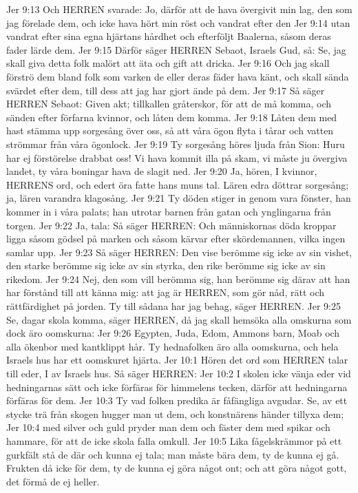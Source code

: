 Jer 9:13  Och HERREN svarade: Jo, därför att de hava övergivit min lag, den som jag förelade dem, och icke hava hört min röst och vandrat efter den
Jer 9:14  utan vandrat efter sina egna hjärtans hårdhet och efterföljt Baalerna, såsom deras fader lärde dem.
Jer 9:15  Därför säger HERREN Sebaot, Israels Gud, så: Se, jag skall giva detta folk malört att äta och gift att dricka.
Jer 9:16  Och jag skall förströ dem bland folk som varken de eller deras fäder hava känt, och skall sända svärdet efter dem, till dess att jag har gjort ände på dem.
Jer 9:17  Så säger HERREN Sebaot: Given akt; tillkallen gråterskor, för att de må komma, och sänden efter förfarna kvinnor, och låten dem komma.
Jer 9:18  Låten dem med hast stämma upp sorgesång över oss, så att våra ögon flyta i tårar och vatten strömmar från våra ögonlock.
Jer 9:19  Ty sorgesång höres ljuda från Sion: Huru har ej förstörelse drabbat oss! Vi hava kommit illa på skam, vi måste ju övergiva landet, ty våra boningar hava de slagit ned.
Jer 9:20  Ja, hören, I kvinnor, HERRENS ord, och edert öra fatte hans muns tal. Lären edra döttrar sorgesång; ja, lären varandra klagosång.
Jer 9:21  Ty döden stiger in genom vara fönster, han kommer in i våra palats; han utrotar barnen från gatan och ynglingarna från torgen.
Jer 9:22  Ja, tala: Så säger HERREN: Och människornas döda kroppar ligga såsom gödsel på marken och såsom kärvar efter skördemannen, vilka ingen samlar upp.
Jer 9:23  Så säger HERREN: Den vise berömme sig icke av sin vishet, den starke berömme sig icke av sin styrka, den rike berömme sig icke av sin rikedom.
Jer 9:24  Nej, den som vill berömma sig, han berömme sig därav att han har förstånd till att känna mig: att jag är HERREN, som gör nåd, rätt och rättfärdighet på jorden. Ty till sådana har jag behag, säger HERREN.
Jer 9:25  Se, dagar skola komma, säger HERREN, då jag skall hemsöka alla omskurna som dock äro oomskurna:
Jer 9:26  Egypten, Juda, Edom, Ammons barn, Moab och alla ökenbor med kantklippt hår. Ty hednafolken äro alla oomskurna, och hela Israels hus har ett oomskuret hjärta.
Jer 10:1  Hören det ord som HERREN talar till eder, I av Israels hus. Så säger HERREN:
Jer 10:2  I skolen icke vänja eder vid hedningarnas sätt och icke förfäras för himmelens tecken, därför att hedningarna förfäras för dem.
Jer 10:3  Ty vad folken predika är fåfängliga avgudar. Se, av ett stycke trä från skogen hugger man ut dem, och konstnärens händer tillyxa dem;
Jer 10:4  med silver och guld pryder man dem och fäster dem med spikar och hammare, för att de icke skola falla omkull.
Jer 10:5  Lika fågelskrämmor på ett gurkfält stå de där och kunna ej tala; man måste bära dem, ty de kunna ej gå. Frukten då icke för dem, ty de kunna ej göra något ont; och att göra något gott, det förmå de ej heller.
